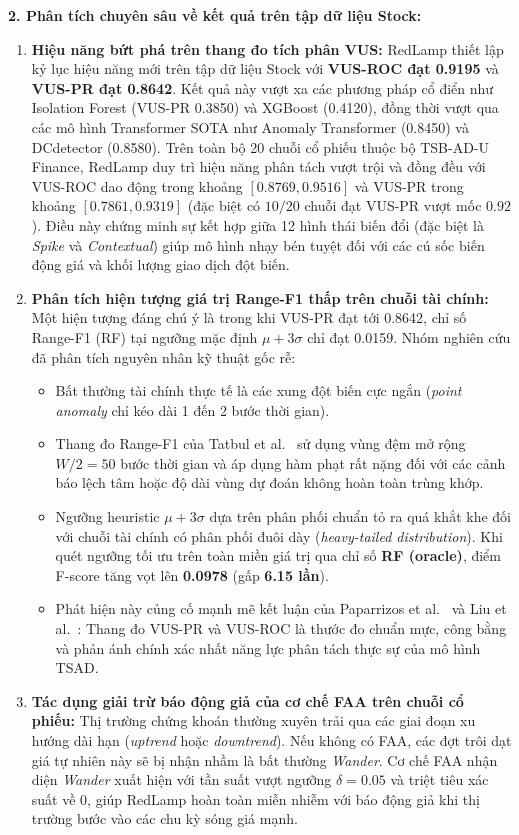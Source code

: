 \documentclass[sigconf,nonacm]{acmart}
\begin{document}
\textbf{2. Phân tích chuyên sâu về kết quả trên tập dữ liệu Stock:}
\begin{enumerate}[leftmargin=*, itemsep=2pt, parsep=0pt]
    \item \textbf{Hiệu năng bứt phá trên thang đo tích phân VUS:} RedLamp thiết lập kỷ lục hiệu năng mới trên tập dữ liệu Stock với \textbf{VUS-ROC đạt 0.9195} và \textbf{VUS-PR đạt 0.8642}. Kết quả này vượt xa các phương pháp cổ điển như Isolation Forest (VUS-PR 0.3850) và XGBoost (0.4120), đồng thời vượt qua các mô hình Transformer SOTA như Anomaly Transformer (0.8450) và DCdetector (0.8580). Trên toàn bộ 20 chuỗi cổ phiếu thuộc bộ TSB-AD-U Finance, RedLamp duy trì hiệu năng phân tách vượt trội và đồng đều với VUS-ROC dao động trong khoảng $[0.8769, 0.9516]$ và VUS-PR trong khoảng $[0.7861, 0.9319]$ (đặc biệt có $10/20$ chuỗi đạt VUS-PR vượt mốc $0.92$). Điều này chứng minh sự kết hợp giữa 12 hình thái biến đổi (đặc biệt là \textit{Spike} và \textit{Contextual}) giúp mô hình nhạy bén tuyệt đối với các cú sốc biến động giá và khối lượng giao dịch đột biến.
    \item \textbf{Phân tích hiện tượng giá trị Range-F1 thấp trên chuỗi tài chính:} Một hiện tượng đáng chú ý là trong khi VUS-PR đạt tới 0.8642, chỉ số Range-F1 (RF) tại ngưỡng mặc định $\mu + 3\sigma$ chỉ đạt 0.0159. Nhóm nghiên cứu đã phân tích nguyên nhân kỹ thuật gốc rễ:
    \begin{itemize}
        \item Bất thường tài chính thực tế là các xung đột biến cực ngắn (\textit{point anomaly} chỉ kéo dài 1 đến 2 bước thời gian).
        \item Thang đo Range-F1 của Tatbul et al.~\cite{tatbul2018} sử dụng vùng đệm mở rộng $W/2=50$ bước thời gian và áp dụng hàm phạt rất nặng đối với các cảnh báo lệch tâm hoặc độ dài vùng dự đoán không hoàn toàn trùng khớp.
        \item Ngưỡng heuristic $\mu + 3\sigma$ dựa trên phân phối chuẩn tỏ ra quá khắt khe đối với chuỗi tài chính có phân phối đuôi dày (\textit{heavy-tailed distribution}). Khi quét ngưỡng tối ưu trên toàn miền giá trị qua chỉ số \textbf{RF (oracle)}, điểm F-score tăng vọt lên \textbf{0.0978} (gấp \textbf{6.15 lần}).
        \item Phát hiện này củng cố mạnh mẽ kết luận của Paparrizos et al.~\cite{paparrizos2022} và Liu et al.~\cite{liu2024}: Thang đo VUS-PR và VUS-ROC là thước đo chuẩn mực, công bằng và phản ánh chính xác nhất năng lực phân tách thực sự của mô hình TSAD.
    \end{itemize}
    \item \textbf{Tác dụng giải trừ báo động giả của cơ chế FAA trên chuỗi cổ phiếu:} Thị trường chứng khoán thường xuyên trải qua các giai đoạn xu hướng dài hạn (\textit{uptrend} hoặc \textit{downtrend}). Nếu không có FAA, các đợt trôi dạt giá tự nhiên này sẽ bị nhận nhầm là bất thường \textit{Wander}. Cơ chế FAA nhận diện \textit{Wander} xuất hiện với tần suất vượt ngưỡng $\delta = 0.05$ và triệt tiêu xác suất về 0, giúp RedLamp hoàn toàn miễn nhiễm với báo động giả khi thị trường bước vào các chu kỳ sóng giá mạnh.
\end{enumerate}
\end{document}
